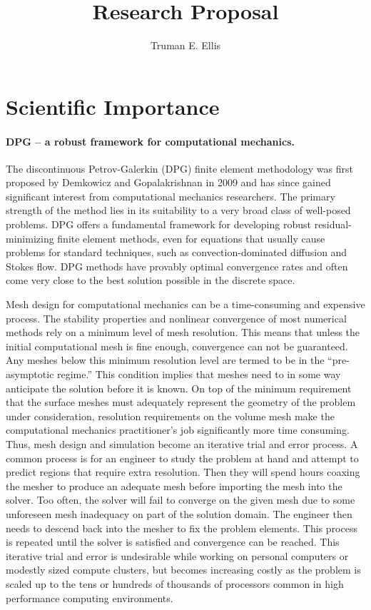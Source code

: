 \documentclass[letterpaper]{article}
\title{Research Proposal}
\author{Truman E. Ellis}
\date{}
\begin{document}
\maketitle

\section*{Scientific Importance}
\paragraph{DPG -- a robust framework for computational mechanics.}
The discontinuous Petrov-Galerkin (DPG) finite element methodology was first proposed by Demkowicz and Gopalakrishnan \cite{DPG1,DPG2} 
in 2009 and has since gained significant interest from computational mechanics researchers.
The primary strength of the method lies in its suitability to a very broad class of well-posed problems.
DPG offers a fundamental framework for developing robust residual-minimizing finite element methods, even for equations that usually cause problems
for standard techniques, such as convection-dominated diffusion and Stokes flow.
DPG methods have provably optimal convergence rates and often come very close to the best solution possible in the discrete space.

Mesh design for computational mechanics can be a time-consuming and expensive process.
The stability properties and nonlinear convergence of most numerical methods rely on a minimum level of mesh resolution. 
This means that unless the initial computational mesh is fine enough, convergence can not be guaranteed. 
Any meshes below this minimum resolution level are termed to be in the ``pre-asymptotic regime.'' 
This condition implies that meshes need to in some way anticipate the solution before it is known. 
On top of the minimum requirement that the surface meshes must adequately represent the geometry of the problem under consideration, 
resolution requirements on the volume mesh make the computational mechanics practitioner's job significantly more time consuming. 
Thus, mesh design and simulation become an iterative trial and error process.
A common process is for an engineer to study the problem at hand and attempt to predict regions that require extra resolution. 
Then they will spend hours coaxing the mesher to produce an adequate mesh before importing the mesh into the solver.
Too often, the solver will fail to converge on the given mesh due to some unforeseen mesh inadequacy on part of the solution domain.
The engineer then needs to descend back into the mesher to fix the problem elements.
This process is repeated until the solver is satisfied and convergence can be reached.
This iterative trial and error is undesirable while working on personal computers or modestly sized compute clusters, 
but becomes increasing costly as the problem is scaled up to the tens or hundreds of thousands of processors common in high performance computing environments.
\end{document}
